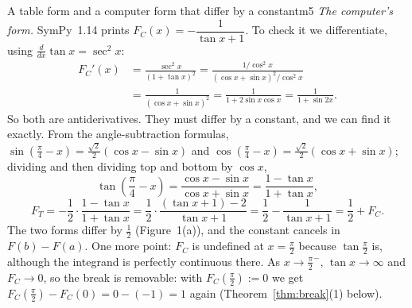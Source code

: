 \documentclass[11pt]{article}
\begin{document}
\begin{exmp}{A table form and a computer form that differ by a constant}{m5}
\emph{The computer's form.} SymPy~1.14 prints $F_C(x)=-\dfrac1{\tan x+1}$. To check it we differentiate, using $\frac d{dx}\tan x=\sec^2x$:
\begin{align*}F_C'(x)&=\frac{\sec^2x}{(1+\tan x)^2}=\frac{1/\cos^2x}{(\cos x+\sin x)^2/\cos^2x}\\&=\frac1{(\cos x+\sin x)^2}=\frac1{1+2\sin x\cos x}=\frac1{1+\sin2x}.\end{align*}
So both are antiderivatives. They must differ by a constant, and we can find it exactly. From the angle-subtraction formulas, $\sin\left(\frac\pi4-x\right)=\frac{\sqrt2}2(\cos x-\sin x)$ and $\cos\left(\frac\pi4-x\right)=\frac{\sqrt2}2(\cos x+\sin x)$; dividing and then dividing top and bottom by $\cos x$,
\[\tan\left(\frac\pi4-x\right)=\frac{\cos x-\sin x}{\cos x+\sin x}=\frac{1-\tan x}{1+\tan x},\]
\[F_T=-\frac12\cdot\frac{1-\tan x}{1+\tan x}=\frac12\cdot\frac{(\tan x+1)-2}{\tan x+1}=\frac12-\frac1{\tan x+1}=\frac12+F_C .\]
The two forms differ by $\frac12$ (Figure~1(a)), and the constant cancels in $F(b)-F(a)$. One more point: $F_C$ is undefined at $x=\frac\pi2$ because $\tan\frac\pi2$ is, although the integrand is perfectly continuous there. As $x\to\frac\pi2^-$, $\tan x\to\infty$ and $F_C\to0$, so the break is removable: with $F_C\left(\frac\pi2\right):=0$ we get $F_C\left(\frac\pi2\right)-F_C(0)=0-(-1)=1$ again (Theorem~\ref{thm:break}(1) below).


\end{exmp}
\end{document}
